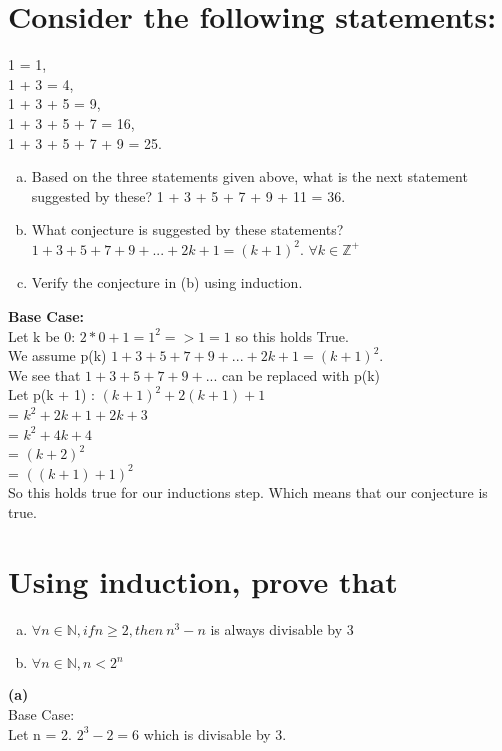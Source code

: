 \section{Consider the following statements:}
1 = 1,\\
1 + 3 = 4,\\
1 + 3 + 5 = 9,\\
1 + 3 + 5 + 7 = 16,\\
1 + 3 + 5 + 7 + 9 = 25.\\
\begin{enumerate}[(a)]
\item Based on the three statements given above, what is the next statement suggested by these?
1 + 3 + 5 + 7 + 9 + 11 = 36.
\item What conjecture is suggested by these statements?
$1 + 3 + 5 + 7 + 9 + ... + 2k + 1 = (k + 1)^2$. $\forall k \in \mathbb{Z}^{+}$
\item Verify the conjecture in (b) using induction.
\end{enumerate}
\textbf{Base Case:}\\
Let k be 0: $2*0 + 1 = 1^2 => 1 = 1$ so this holds True.\\
We assume p(k)
$1 + 3 + 5 + 7 + 9 + ... + 2k + 1 = (k + 1)^2$.\\
We see that $1 + 3 + 5 + 7 + 9 + ...$ can be replaced with p(k)\\
Let p(k + 1) : $(k + 1)^2 + 2(k + 1) + 1$\\
 = $k^2 + 2k + 1 + 2k + 3$\\
 = $k^2 + 4k + 4$\\
 = $(k + 2)^2$\\
 = $((k + 1) + 1)^2$\\
 So this holds true for our inductions step. Which means that our conjecture is true. {\Huge\Bat}


\section{Using induction, prove that}
\begin{enumerate}[(a)]
\item $\forall n \in \mathbb{N}, if n\geq 2, then \ n^3-n$ is always divisable by 3
\item $\forall n \in \mathbb{N},n < 2^n$
\end{enumerate}
\textbf{(a)}\\
Base Case:\\
Let n = 2. $2^3 - 2 = 6$ which is divisable by 3.\\

